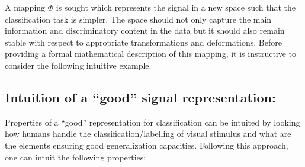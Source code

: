 \documentclass[a4paper,11pt]{report}
\begin{document}
		A mapping $\Phi$ is sought which represents the signal in a new space such that the classification task is simpler. The space should not only capture the main information and discriminatory content in the data but it should also remain stable with respect to appropriate transformations and deformations. Before providing a formal mathematical description of this mapping, it is instructive to consider the following intuitive example.
    
		\subsection{Intuition of a ``good'' signal representation:}
      \label{sec:Intro/Signal rep/Intuition}
      
      Properties of a ``good'' representation for classification can be intuited by looking how humans handle the classification/labelling of visual stimulus and what are the elements ensuring good generalization capacities. Following this approach, one can intuit the following properties:\\
            
\end{document}
